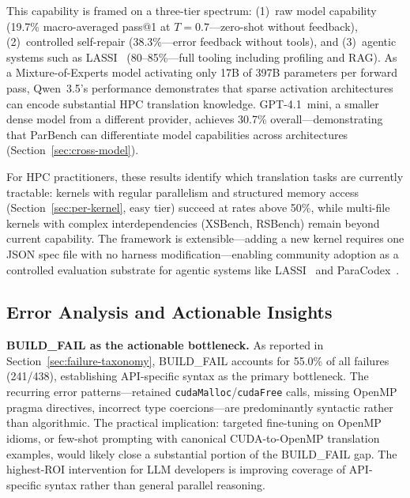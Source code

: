 \documentclass[conference]{IEEEtran}
\begin{document}
This capability is framed on a three-tier spectrum: (1)~raw model capability (19.7\% macro-averaged pass@1 at $T{=}0.7$---zero-shot without feedback), (2)~controlled self-repair (38.3\%---error feedback without tools), and (3)~agentic systems such as LASSI~\cite{LASSI2024} (80--85\%---full tooling including profiling and RAG). As a Mixture-of-Experts model activating only 17B of 397B parameters per forward pass, Qwen~3.5's performance demonstrates that sparse activation architectures can encode substantial HPC translation knowledge. GPT-4.1~mini, a smaller dense model from a different provider, achieves 30.7\% overall---demonstrating that ParBench can differentiate model capabilities across architectures (Section~\ref{sec:cross-model}). %

For HPC practitioners, these results identify which translation tasks are currently tractable: kernels with regular parallelism and structured memory access (Section~\ref{sec:per-kernel}, easy tier) succeed at rates above 50\%, while multi-file kernels with complex interdependencies (XSBench, RSBench) remain beyond current capability. The framework is extensible---adding a new kernel requires one JSON spec file with no harness modification---enabling community adoption as a controlled evaluation substrate for agentic systems like LASSI~\cite{LASSI2024} and ParaCodex~\cite{ParaCodex2026}.

\subsection{Error Analysis and Actionable Insights}
\label{sec:error-analysis}

\textbf{BUILD\_FAIL as the actionable bottleneck.} As reported in Section~\ref{sec:failure-taxonomy}, BUILD\_FAIL accounts for 55.0\% of all failures (241/438), establishing API-specific syntax as the primary bottleneck. The recurring error patterns---retained \texttt{cudaMalloc}/\texttt{cudaFree} calls, missing OpenMP pragma directives, incorrect type coercions---are predominantly syntactic rather than algorithmic. The practical implication: targeted fine-tuning on OpenMP idioms, or few-shot prompting with canonical CUDA-to-OpenMP translation examples, would likely close a substantial portion of the BUILD\_FAIL gap. The highest-ROI intervention for LLM developers is improving coverage of API-specific syntax rather than general parallel reasoning.
\end{document}
